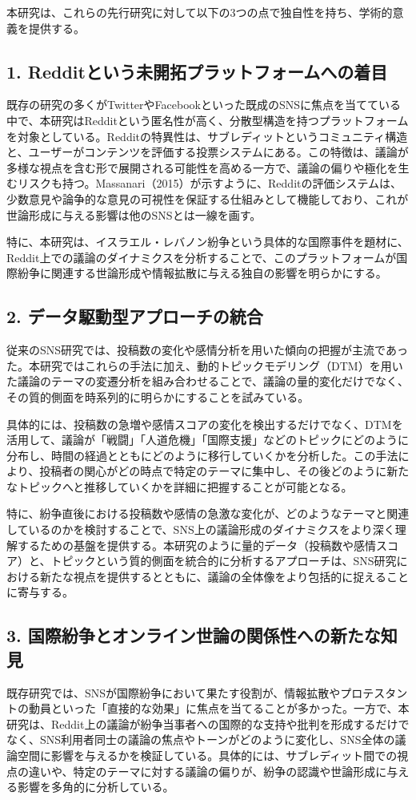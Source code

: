 \documentclass[11pt, a4j]{jreport}
\begin{document}
    本研究は、これらの先行研究に対して以下の3つの点で独自性を持ち、学術的意義を提供する。

    \subsection*{1. Redditという未開拓プラットフォームへの着目}
    既存の研究の多くがTwitterやFacebookといった既成のSNSに焦点を当てている中で、本研究はRedditという匿名性が高く、分散型構造を持つプラットフォームを対象としている。Redditの特異性は、サブレディットというコミュニティ構造と、ユーザーがコンテンツを評価する投票システムにある。この特徴は、議論が多様な視点を含む形で展開される可能性を高める一方で、議論の偏りや極化を生むリスクも持つ。Massanari（2015）が示すように、Redditの評価システムは、少数意見や論争的な意見の可視性を保証する仕組みとして機能しており、これが世論形成に与える影響は他のSNSとは一線を画す。

    特に、本研究は、イスラエル・レバノン紛争という具体的な国際事件を題材に、Reddit上での議論のダイナミクスを分析することで、このプラットフォームが国際紛争に関連する世論形成や情報拡散に与える独自の影響を明らかにする。

    \subsection*{2. データ駆動型アプローチの統合}
    従来のSNS研究では、投稿数の変化や感情分析を用いた傾向の把握が主流であった。本研究ではこれらの手法に加え、動的トピックモデリング（DTM）を用いた議論のテーマの変遷分析を組み合わせることで、議論の量的変化だけでなく、その質的側面を時系列的に明らかにすることを試みている。

    具体的には、投稿数の急増や感情スコアの変化を検出するだけでなく、DTMを活用して、議論が「戦闘」「人道危機」「国際支援」などのトピックにどのように分布し、時間の経過とともにどのように移行していくかを分析した。この手法により、投稿者の関心がどの時点で特定のテーマに集中し、その後どのように新たなトピックへと推移していくかを詳細に把握することが可能となる。

    特に、紛争直後における投稿数や感情の急激な変化が、どのようなテーマと関連しているのかを検討することで、SNS上の議論形成のダイナミクスをより深く理解するための基盤を提供する。本研究のように量的データ（投稿数や感情スコア）と、トピックという質的側面を統合的に分析するアプローチは、SNS研究における新たな視点を提供するとともに、議論の全体像をより包括的に捉えることに寄与する。    

    \subsection*{3. 国際紛争とオンライン世論の関係性への新たな知見}
    既存研究では、SNSが国際紛争において果たす役割が、情報拡散やプロテスタントの動員といった「直接的な効果」に焦点を当てることが多かった。一方で、本研究は、Reddit上の議論が紛争当事者への国際的な支持や批判を形成するだけでなく、SNS利用者同士の議論の焦点やトーンがどのように変化し、SNS全体の議論空間に影響を与えるかを検証している。具体的には、サブレディット間での視点の違いや、特定のテーマに対する議論の偏りが、紛争の認識や世論形成に与える影響を多角的に分析している。
\end{document}
